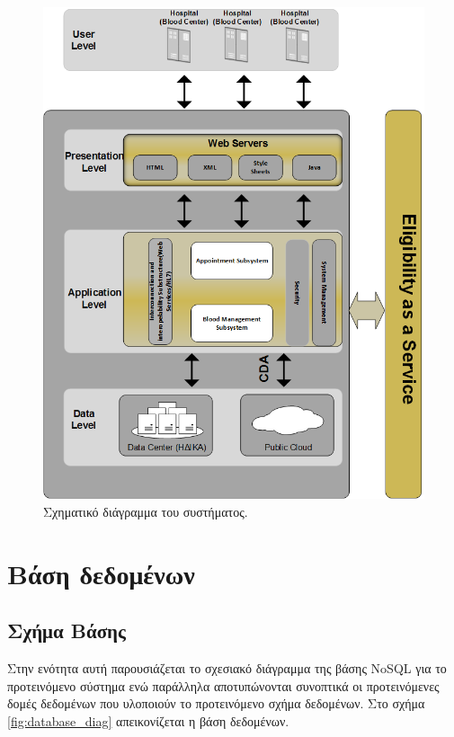 	\begin{figure}[H]
	    \centering
	    \includegraphics[width=1\textwidth]{architecture.png}
	    \caption{ Σχηματικό διάγραμμα του συστήματος. }
	    \label{fig:architect_schema}
	\end{figure}

\section{Βάση δεδομένων}
	\subsection{Σχήμα Βάσης}
	
	Στην ενότητα αυτή παρουσιάζεται το σχεσιακό διάγραμμα της βάσης NoSQL για το προτεινόμενο σύστημα ενώ παράλληλα αποτυπώνονται συνοπτικά οι προτεινόμενες δομές δεδομένων που υλοποιούν το προτεινόμενο σχήμα δεδομένων. Στο σχήμα \ref{fig:database_diag} απεικονίζεται η βάση δεδομένων.
	
